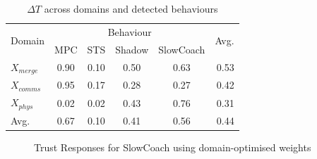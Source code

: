 \documentclass[conference]{IEEEtran}
\begin{document}
\begin{table}
  \centering
  \caption{$\Delta T$ across domains and detected behaviours}
  \begin{tabular}{l*{4}{c}r}
    \toprule
    \multirow{2}{*}[-2pt]{Domain} & \multicolumn{4}{c}{Behaviour}&\multirow{2}{*}[-2pt]{Avg.}\\ \cmidrule(r){2-5}
    &  MPC &  STS &  Shadow &  SlowCoach & \\
    \midrule
    $X_{merge}$& 0.90 & 0.10 &    0.50 &       0.63 &  0.53 \\
    $X_{comms}$& 0.95 & 0.17 &    0.28 &       0.27 &  0.42 \\
    $X_{phys}$ & 0.02 & 0.02 &    0.43 &       0.76 &  0.31 \\
    \hline
    Avg.       & 0.67 & 0.10 &    0.41 &       0.56 &  0.44 \\
    \bottomrule
  \end{tabular}
  \label{tab:domain_deltas}
\end{table}
%
\begin{figure}[h]
  \centering
  \hfill
  \caption{Trust Responses for SlowCoach using domain-optimised weights}
\end{figure}
%
\end{document}
